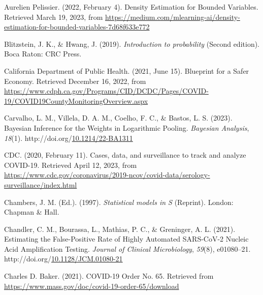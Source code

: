 \documentclass[12pt,twoside]{smiththesis}
\newlength{\cslhangindent}
\newenvironment{CSLReferences}[2] %
 {%
\setlength{\parindent}{0pt}
\ifodd #1 \everypar{\setlength{\hangindent}{\cslhangindent}}\ignorespaces\fi
\ifnum #2 > 0
\setlength{\parskip}{#2\baselineskip}
  \fi
}%
{}
\begin{document}
\noindent

\setlength{\parindent}{-0.20in}
\setlength{\leftskip}{0.20in}
\setlength{\parskip}{8pt}

\hypertarget{refs}{}
\begin{CSLReferences}{1}{0}
\leavevmode{}%
Aurelien Pelissier. (2022, February 4). Density {Estimation} for {Bounded Variables}. Retrieved March 19, 2023, from \url{https://medium.com/mlearning-ai/density-estimation-for-bounded-variables-7d68f633e772}

\leavevmode{}%
Blitzstein, J. K., \& Hwang, J. (2019). \emph{Introduction to probability} (Second edition). {Boca Raton}: {CRC Press}.

\leavevmode{}%
California Department of Public Health. (2021, June 15). Blueprint for a {Safer Economy}. Retrieved December 16, 2022, from \url{https://www.cdph.ca.gov/Programs/CID/DCDC/Pages/COVID-19/COVID19CountyMonitoringOverview.aspx}

\leavevmode{}%
Carvalho, L. M., Villela, D. A. M., Coelho, F. C., \& Bastos, L. S. (2023). Bayesian {Inference} for the {Weights} in {Logarithmic Pooling}. \emph{Bayesian Analysis}, \emph{18}(1). http://doi.org/\href{https://doi.org/10.1214/22-BA1311}{10.1214/22-BA1311}

\leavevmode{}%
CDC. (2020, February 11). Cases, data, and surveillance to track and analyze {COVID-19}. Retrieved April 12, 2023, from \url{https://www.cdc.gov/coronavirus/2019-ncov/covid-data/serology-surveillance/index.html}

\leavevmode{}%
Chambers, J. M. (Ed.). (1997). \emph{Statistical models in {S}} (Reprint). {London}: {Chapman \& Hall}.

\leavevmode{}%
Chandler, C. M., Bourassa, L., Mathias, P. C., \& Greninger, A. L. (2021). Estimating the {False-Positive Rate} of {Highly Automated SARS-CoV-2 Nucleic Acid Amplification Testing}. \emph{Journal of Clinical Microbiology}, \emph{59}(8), e01080--21. http://doi.org/\href{https://doi.org/10.1128/JCM.01080-21}{10.1128/JCM.01080-21}

\leavevmode{}%
Charles D. Baker. (2021). {COVID-19 Order No}. 65. Retrieved from \url{https://www.mass.gov/doc/covid-19-order-65/download}


\end{CSLReferences}
\end{document}
